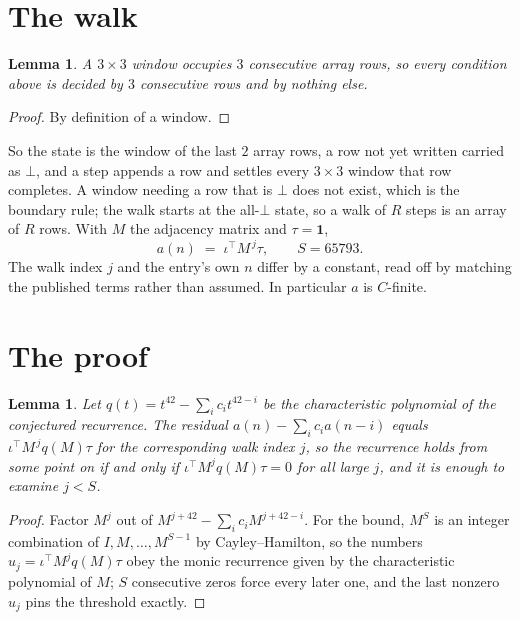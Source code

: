 \documentclass[11pt,a4paper]{article}
\theoremstyle{plain}
\newtheorem{lemma}[theorem]{Lemma}
\theoremstyle{definition}
\begin{document}
\section{The walk}

\begin{lemma}\label{lem:win}
A $3\times3$ window occupies $3$ consecutive array rows, so every condition above is
decided by $3$ consecutive rows and by nothing else.
\end{lemma}

\begin{proof}
By definition of a window.
\end{proof}

So the state is the window of the last $2$ array rows, a row not yet written carried as
$\bot$, and a step appends a row and settles every $3\times3$ window that row completes. A
window needing a row that is $\bot$ does not exist, which is the boundary rule; the walk starts
at the all-$\bot$ state, so a walk of $R$ steps is an array of $R$ rows. With $M$ the adjacency
matrix and $\tau=\mathbf{1}$,
\[
a(n)\;=\;\iota^{\!\top}M^{\,j}\tau ,\qquad S=65793.
\]
The walk index $j$ and the entry's own $n$ differ by a constant, read off by matching the
published terms rather than assumed. In particular $a$ is $C$-finite.

\section{The proof}

\begin{lemma}\label{lem:crit}
Let $q(t)=t^{42}-\sum_i c_it^{42-i}$ be the characteristic polynomial of the
conjectured recurrence. The residual $a(n)-\sum_ic_ia(n-i)$ equals
$\iota^{\!\top}M^{\,j}q(M)\tau$ for the corresponding walk index $j$, so the recurrence
holds from some point on if and only if $\iota^{\!\top}M^{j}q(M)\tau=0$ for all large $j$,
and it is enough to examine $j<S$.
\end{lemma}

\begin{proof}
Factor $M^{j}$ out of $M^{j+42}-\sum_ic_iM^{j+42-i}$. For the bound, $M^{S}$
is an integer combination of $I,M,\dots,M^{S-1}$ by Cayley--Hamilton, so the numbers
$u_j=\iota^{\!\top}M^{j}q(M)\tau$ obey the monic recurrence given by the characteristic
polynomial of $M$; $S$ consecutive zeros force every later one, and the last nonzero $u_j$
pins the threshold exactly.
\end{proof}
\end{document}
